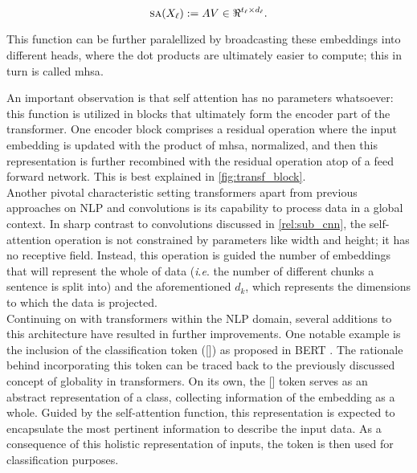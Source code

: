 \begin{equation}
	\sa(X_\ell) \defn A V \in \real^{t_\ell \times d_\ell}.
\label{eq:SA}
\end{equation}

This function can be further paralellized by broadcasting these embeddings into different 
heads, where the dot products are ultimately easier to compute; this in turn is called \gls{mhsa}.

An important observation is that self attention has no parameters whatsoever: this function is 
utilized in blocks that ultimately form the encoder part of the transformer. One encoder block 
comprises a residual operation where the input embedding is updated with the product of \gls{mhsa}, 
normalized, and then this representation is further recombined with the residual operation atop of 
a feed forward network. This is best explained in \autoref{fig:transf_block}.\\



\noindent Another pivotal characteristic setting transformers apart from previous approaches on NLP 
and convolutions is its capability to process data in a global context. In sharp contrast to 
convolutions discussed in \autoref{rel:sub_cnn}, the self-attention operation is not constrained by 
parameters like width and height; it has no receptive field. Instead, this operation is guided 
the number of embeddings that will represent the whole of data (\textit{i}.\textit{e}. the number 
of different chunks a sentence is split into) and the aforementioned $d_k$, which represents the 
dimensions to which the data is projected. \\

\noindent Continuing on with transformers within the NLP domain, several additions 
to this architecture have resulted in further improvements. One notable example is the inclusion of 
the classification token ([]) as proposed in BERT \autocite{devlin2018bert}. The rationale 
behind incorporating this token can be traced back to the previously discussed concept of globality 
in transformers. On its own, the [] token serves as an abstract representation of a 
class, collecting information of the embedding as a whole. Guided by the 
self-attention function, this representation is expected to encapsulate the most pertinent 
information to describe the input data. As a consequence of this holistic representation of inputs, 
the token is then used for classification purposes.\\

